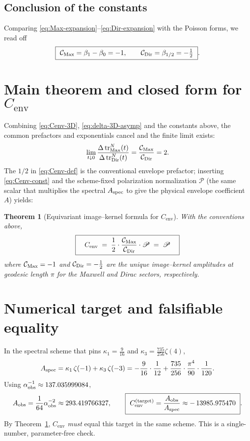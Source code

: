 \documentclass[11pt]{article}
\newtheorem{theorem}{Theorem}[section]
\theoremstyle{definition}
\theoremstyle{remark}
\DeclareMathOperator{\tr}{tr}
\begin{document}
\subsection{Conclusion of the constants}
Comparing \eqref{eq:Max-expansion}--\eqref{eq:Dir-expansion} with the Poisson forms, we read off
\[
\boxed{\ \mathcal{C}_{\rm Max}=\beta_1-\beta_0=-1,\qquad \mathcal{C}_{\rm Dir}=\beta_{1/2}=-\tfrac{1}{2}\ }.
\]

\section{Main theorem and closed form for $C_{\mathrm{env}}$}
Combining \eqref{eq:Cenv-3D}, \eqref{eq:delta-3D-asymp} and the constants above, the common prefactors and exponentials cancel and the finite limit exists:
\begin{equation}\label{eq:Cenv-const}
\lim_{t\downarrow 0}\frac{\Delta \tr^{N}_{\rm Max}(t)}{\Delta \tr^{N}_{\rm Dir}(t)}=\frac{\mathcal{C}_{\rm Max}}{\mathcal{C}_{\rm Dir}}=2.
\end{equation}
The $1/2$ in \eqref{eq:Cenv-def} is the conventional envelope prefactor; inserting \eqref{eq:Cenv-const} and the scheme-fixed polarization normalization $\mathscr{P}$ (the same scalar that multiplies the spectral $A_{\rm spec}$ to give the physical envelope coefficient $A$) yields:
\begin{theorem}[Equivariant image--kernel formula for $C_{\mathrm{env}}$]\label{thm:Cenv}
With the conventions above,
\[
\boxed{\quad C_{\mathrm{env}}\;=\;\frac{1}{2}\cdot\frac{\mathcal{C}_{\rm Max}}{\mathcal{C}_{\rm Dir}}\cdot \mathscr{P}\;=\;\mathscr{P}\quad}
\]
where $\mathcal{C}_{\rm Max}=-1$ and $\mathcal{C}_{\rm Dir}=-\tfrac{1}{2}$ are the unique image--kernel amplitudes at geodesic length $\pi$ for the Maxwell and Dirac sectors, respectively.
\end{theorem}

\section{Numerical target and falsifiable equality}
In the spectral scheme that pins $\kappa_1=\frac{9}{16}$ and $\kappa_3=\frac{735}{256}\zeta(4)$,
\[
A_{\rm spec}=\kappa_1\,\zeta(-1)+\kappa_3\,\zeta(-3)= -\frac{9}{16}\cdot\frac{1}{12}+\frac{735}{256}\cdot\frac{\pi^4}{90}\cdot\frac{1}{120}.
\]
Using $\alpha_{\rm obs}^{-1}\approx 137.035999084$,
\[
A_{\rm obs}=\frac{1}{64}\alpha_{\rm obs}^{-2}\approx 293.419766327,
\qquad
\boxed{\ C_{\mathrm{env}}^{\rm (target)}=\frac{A_{\rm obs}}{A_{\rm spec}}\approx -\,13985.975470\ }.
\]
By Theorem~\ref{thm:Cenv}, $C_{\mathrm{env}}$ \emph{must} equal this target in the same scheme. This is a single-number, parameter-free check.
\end{document}
